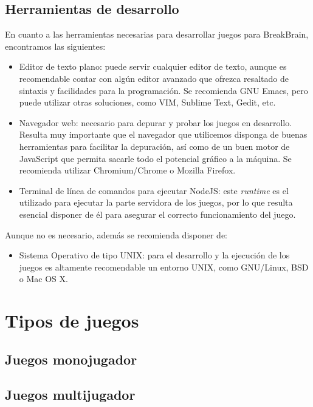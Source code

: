 \subsection{Herramientas de desarrollo}

En cuanto a las herramientas necesarias para desarrollar juegos para BreakBrain, encontramos las siguientes:

\begin{itemize}
\item Editor de texto plano: puede servir cualquier editor de texto, aunque es recomendable contar con algún editor avanzado que ofrezca resaltado de sintaxis y facilidades para la programación. Se recomienda GNU Emacs, pero puede utilizar otras soluciones, como VIM, Sublime Text, Gedit, etc.
\item Navegador web: necesario para depurar y probar los juegos en desarrollo. Resulta muy importante que el navegador que utilicemos disponga de buenas herramientas para facilitar la depuración, así como de un buen motor de JavaScript que permita sacarle todo el potencial gráfico a la máquina. Se recomienda utilizar Chromium/Chrome o Mozilla Firefox.
\item Terminal de línea de comandos para ejecutar NodeJS: este {\it runtime} es el utilizado para ejecutar la parte servidora de los juegos, por lo que resulta esencial disponer de él para asegurar el correcto funcionamiento del juego.
\end{itemize}

Aunque no es necesario, además se recomienda disponer de:

\begin{itemize}
\item Sistema Operativo de tipo UNIX: para el desarrollo y la ejecución de los juegos es altamente recomendable un entorno UNIX, como GNU/Linux, BSD o Mac OS X. 
\end{itemize}

\section{Tipos de juegos}


\subsection{Juegos monojugador}


\subsection{Juegos multijugador}



